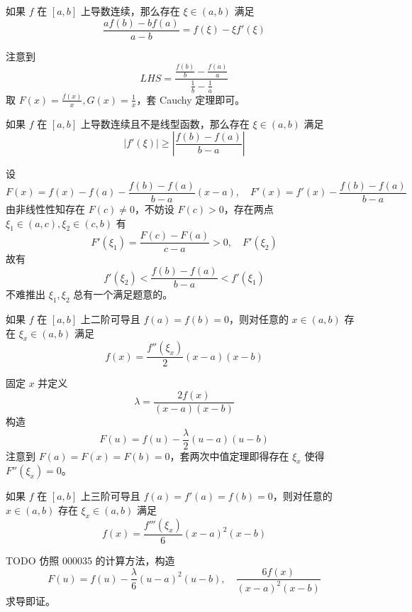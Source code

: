 \begin{problem}[000033]
如果 $f$ 在 $[a, b]$ 上导数连续，那么存在 $\xi \in (a, b)$ 满足
\[ \frac{af(b) - bf(a)}{a - b} = f(\xi) - \xi f'(\xi) \]
\end{problem}

\begin{solution}
	注意到
	\[ LHS = \frac{\frac{f(b)}{b} - \frac{f(a)}{a}}{\frac{1}{b} - \frac{1}{a}} \]
	取 $F(x) = \frac{f(x)}{x}, G(x) = \frac{1}{x}$，套 Cauchy 定理即可。
\end{solution}

\begin{problem}[000034]
如果 $f$ 在 $[a, b]$ 上导数连续且不是线型函数，那么存在 $\xi \in (a, b)$ 满足
\[ |f'(\xi)| \geqslant \left| \frac{f(b) - f(a)}{b - a} \right| \]
\end{problem}

\begin{solution}
	设
	\[ F(x) = f(x) - f(a) - \frac{f(b) - f(a)}{b - a}(x - a), \quad F'(x) = f'(x) - \frac{f(b) - f(a)}{b - a} \]
	由非线性性知存在 $F(c) \neq 0$，不妨设 $F(c) > 0$，存在两点 $\xi_1 \in (a, c), \xi_2 \in (c, b)$ 有
	\[ F'(\xi_1) = \frac{F(c) - F(a)}{c - a} > 0, \quad F'(\xi_2)  \]
	故有
	\[ f'(\xi_2) < \frac{f(b) - f(a)}{b - a} < f'(\xi_1) \]
	不难推出 $\xi_1, \xi_2$ 总有一个满足题意的。
\end{solution}

\begin{problem}[000035]
如果 $f$ 在 $[a, b]$ 上二阶可导且 $f(a) = f(b) = 0$，则对任意的 $x \in (a, b)$ 存在 $\xi_x \in (a, b)$ 满足
\[ f(x) = \frac{f''(\xi_x)}{2}(x - a)(x - b) \]
\end{problem}

\begin{solution}
	固定 $x$ 并定义
	\[ \lambda = \frac{2 f(x)}{(x - a)(x - b)} \]
	构造
	\[ F(u) = f(u) - \frac{\lambda}{2} (u - a)(u - b) \]
	注意到 $F(a) = F(x) = F(b) = 0$，套两次中值定理即得存在 $\xi_x$ 使得 $F''(\xi_x) = 0$。
\end{solution}

\begin{problem}[000036]
如果 $f$ 在 $[a, b]$ 上三阶可导且 $f(a) = f'(a) = f(b) = 0$，则对任意的 $x \in (a, b)$ 存在 $\xi_x \in (a, b)$ 满足
\[ f(x) = \frac{f'''(\xi_x)}{6}(x-a)^2(x-b) \]
\end{problem}

\begin{solution}
	TODO 仿照 000035 的计算方法，构造
	\[ F(u) = f(u) - \frac{\lambda}{6}(u - a)^2(u - b), \quad \frac{6f(x)}{(x - a)^2(x - b)} \]
	求导即证。
\end{solution}

